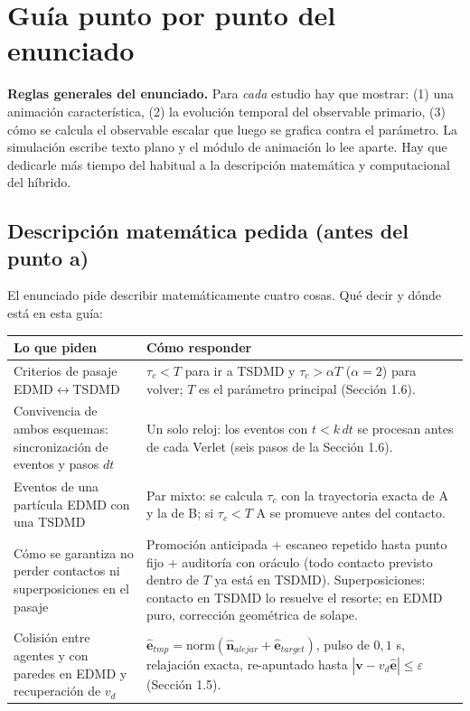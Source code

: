 \documentclass[10.5pt,a4paper]{article}
\newcommand{\vect}[1]{\mathbf{#1}}
\begin{document}
\section{Guía punto por punto del enunciado}

\textbf{Reglas generales del enunciado.} Para \emph{cada} estudio hay que mostrar: (1) una animación característica, (2) la evolución temporal del observable primario, (3) cómo se calcula el observable escalar que luego se grafica contra el parámetro. La simulación escribe texto plano y el módulo de animación lo lee aparte. Hay que dedicarle más tiempo del habitual a la descripción matemática y computacional del híbrido.

\subsection{Descripción matemática pedida (antes del punto a)}
El enunciado pide describir matemáticamente cuatro cosas. Qué decir y dónde está en esta guía:
\begin{center}\small
\begin{tabular}{@{}p{5.2cm}p{10.8cm}@{}}
\toprule
Lo que piden & Cómo responder \\ \midrule
Criterios de pasaje EDMD$\leftrightarrow$TSDMD & $\tau_c<T$ para ir a TSDMD y $\tau_c>\alpha T$ ($\alpha=2$) para volver; $T$ es el parámetro principal (Sección 1.6). \\
Convivencia de ambos esquemas: sincronización de eventos y pasos $dt$ & Un solo reloj: los eventos con $t<k\,dt$ se procesan antes de cada Verlet (seis pasos de la Sección 1.6). \\
Eventos de una partícula EDMD con una TSDMD & Par mixto: se calcula $\tau_c$ con la trayectoria exacta de A y la de B; si $\tau_c<T$ A se promueve antes del contacto. \\
Cómo se garantiza no perder contactos ni superposiciones en el pasaje & Promoción anticipada + escaneo repetido hasta punto fijo + auditoría con oráculo (todo contacto previsto dentro de $T$ ya está en TSDMD). Superposiciones: contacto en TSDMD lo resuelve el resorte; en EDMD puro, corrección geométrica de solape. \\
Colisión entre agentes y con paredes en EDMD y recuperación de $v_d$ & $\hat{\vect e}_{tmp}=\mathrm{norm}(\hat{\vect n}_{alejar}+\hat{\vect e}_{target})$, pulso de $0{,}1$ s, relajación exacta, re-apuntado hasta $|\vect v-v_d\hat{\vect e}|\leq\varepsilon$ (Sección 1.5). \\ \bottomrule
\end{tabular}
\end{center}
\end{document}
